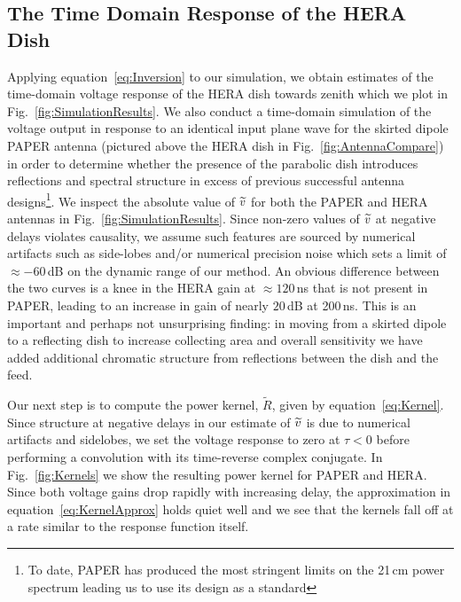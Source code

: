 \documentclass[twocolumn]{emulateapj}
\begin{document}
\subsection{The Time Domain Response of the HERA Dish}\label{ssec:Kernel}
Applying equation~\ref{eq:Inversion} to our simulation, we obtain estimates of the time-domain voltage response of the HERA dish towards zenith which we plot in Fig.~\ref{fig:SimulationResults}. We also conduct a time-domain simulation of the voltage output in response to an identical input plane wave for the skirted dipole PAPER antenna (pictured above the HERA dish in Fig.~\ref{fig:AntennaCompare}) in order to determine whether the presence of the parabolic dish introduces reflections and spectral structure in excess of previous successful antenna designs\footnote{To date, PAPER has produced the most stringent limits on the 21\,cm power spectrum leading us to use its design as a standard}.  We inspect the absolute value of ${\widetilde{v}}$ for both the PAPER and HERA antennas in Fig.~\ref{fig:SimulationResults}. Since non-zero values of ${\widetilde{v}}$ at negative delays violates causality, we assume such features are sourced by numerical artifacts such as side-lobes and/or numerical precision noise which sets a limit of $\approx -60$\,dB on the dynamic range of our method. An obvious difference between the two curves is a knee in the HERA gain at $\approx 120$\,ns that is not present in PAPER, leading to an increase in gain of nearly $20$\,dB at 200\,ns. This is an important and perhaps not unsurprising finding: in moving from a skirted dipole to a reflecting dish to increase collecting area and overall sensitivity we have added additional chromatic structure from reflections between the dish and the feed. 

Our next step is to compute the power kernel, $\widetilde{R}$, given by equation~\ref{eq:Kernel}. Since structure at negative delays in our estimate of ${\widetilde{v}}$ is due to numerical artifacts and sidelobes, we set the voltage response to zero at $\tau<0$ before performing a convolution with its time-reverse complex conjugate. In Fig.~\ref{fig:Kernels} we show the resulting power kernel for PAPER and HERA. Since both voltage gains drop rapidly with increasing delay, the approximation in equation~\ref{eq:KernelApprox} holds quiet well and we see that the kernels fall off at a rate similar to the response function itself. 
\end{document}
